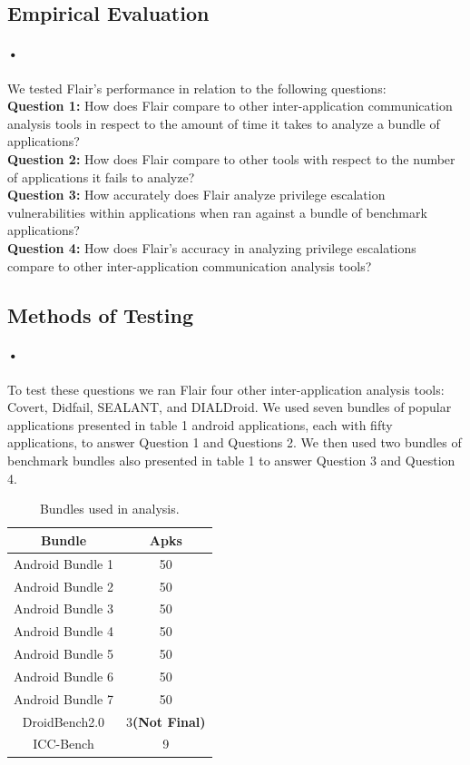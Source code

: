 \documentclass[twocolumn]{article}
\begin{document}
\begin{center}
\section[2]{Empirical Evaluation}
\end{center}

\paragraph{•}
	We tested Flair's performance in relation to the following questions:\\
	\textbf{Question 1:} How does Flair compare to other inter-application communication analysis tools in respect to the amount of time it takes to analyze a bundle of applications?\\
	\textbf{Question 2:} How does Flair compare to other tools with respect to the number of applications it fails to analyze?\\
	\textbf{Question 3:} How accurately does Flair analyze privilege escalation vulnerabilities within applications when ran against a bundle of benchmark applications?\\
	\textbf{Question 4:} How does Flair's accuracy in analyzing privilege escalations compare to other inter-application communication analysis tools?\\

\subsection{Methods of Testing} \label{methods}
\paragraph{•}
	To test these questions we ran Flair four other inter-application analysis tools: Covert, Didfail, SEALANT, and DIALDroid. We used seven bundles of popular applications presented in table 1 android applications, each with fifty applications, to answer Question 1 and Questions 2. We then used two bundles of benchmark bundles also presented in table 1 to answer Question 3 and Question 4. 

\begin{table}[h]
\begin{center}
\begin{tabular}{ |c c| }
	\hline
	Bundle & Apks\\
	\hline
	Android Bundle 1 & 50\\
	Android Bundle 2 & 50\\
	Android Bundle 3 & 50\\
	Android Bundle 4 & 50\\
	Android Bundle 5 & 50\\
	Android Bundle 6 & 50\\
	Android Bundle 7 & 50\\
	DroidBench2.0 & 3\textbf{(Not Final)}\\
	ICC-Bench & 9\\
	\hline
\end{tabular}
\end{center}
\caption{Bundles used in analysis.}
\label{table:1}
\end{table}
\end{document}
